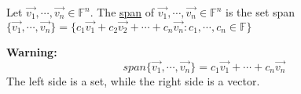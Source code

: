\documentclass[11pt]{article}
\theoremstyle{plain}
\theoremstyle{remark}
\theoremstyle{plain}
\newcommand{\bd}{\textbf}
\begin{document}
\begin{tcolorbox}[colback=green!5!white,colframe=green!75!black,title=Problem 2 ]
    Let $\overrightarrow{v_1}, \cdots, \overrightarrow{v_n}\in\mathbb{F}^n$. The \underline{span} of $\overrightarrow{v_1}, \cdots, \overrightarrow{v_n}\in \mathbb{F}^n$
    is the set span $\{ \overrightarrow{v_1}, \cdots, \overrightarrow{v_n}\} = \{ c_1\overrightarrow{v_1}+c_2\overrightarrow{v_2}+\cdots+c_n\overrightarrow{v_n}: c_1, \cdots, c_n \in \mathbb{F}\}$
\end{tcolorbox}   

\bd{Warning:}\\

\[span\{\overrightarrow{v_1}, \cdots, \overrightarrow{v_n}\} = c_1\overrightarrow{v_1}+\cdots + c_n\overrightarrow{v_n}\]
The left side is a set, while the right side is a vector.
\end{document}
